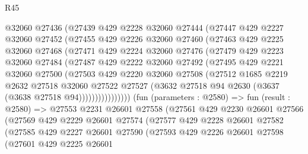 \begin{lexlean}{R45}
\begin{coremodule}
              @32060
              @27436
              (@27439
                @429
                @2228
                @32060
                @27444
                (@27447
                  @429
                  @2227
                  @32060
                  @27452
                  (@27455
                    @429
                    @2226
                    @32060
                    @27460
                    (@27463
                      @429
                      @2225
                      @32060
                      @27468
                      (@27471
                        @429
                        @2224
                        @32060
                        @27476
                        (@27479
                          @429
                          @2223
                          @32060
                          @27484
                          (@27487
                            @429
                            @2222
                            @32060
                            @27492
                            (@27495
                              @429
                              @2221
                              @32060
                              @27500
                              (@27503
                                @429
                                @2220
                                @32060
                                @27508
                                (@27512
                                  @1685
                                  @2219
                                  @2632
                                  @27518
                                  @32060
                                  @27522
                                  @27527
                                  (@3632 @27518 @94 @2630 (@3637 (@3638 @27518 @94))))))))))))))))
        (fun (parameters : @2580) =>
        fun (result : @2580) =>
        @27553
          @2231
          @26601
          @27558
          (@27561
            @429
            @2230
            @26601
            @27566
            (@27569
              @429
              @2229
              @26601
              @27574
              (@27577
                @429
                @2228
                @26601
                @27582
                (@27585
                  @429
                  @2227
                  @26601
                  @27590
                  (@27593
                    @429
                    @2226
                    @26601
                    @27598
                    (@27601
                      @429
                      @2225
                      @26601

\end{coremodule}
\end{lexlean}
